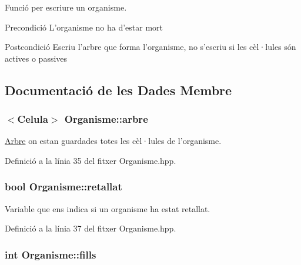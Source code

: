 Funció per escriure un organisme. 

\begin{DoxyPrecond}{Precondició}
L'organisme no ha d'estar mort 
\end{DoxyPrecond}
\begin{DoxyPostcond}{Postcondició}
Escriu l'arbre que forma l'organisme, no s'escriu si les cèl·lules són actives o passives 
\end{DoxyPostcond}


\subsection{Documentació de les Dades Membre}
\hypertarget{class_organisme_aa6bc89f1937afd04f86e770c2bde8c69}{
\subsubsection[{arbre}]{$<${\bf Celula}$>$ Organisme\-::arbre\hspace{0.3cm}{\ttfamily [private]}}}\label{class_organisme_aa6bc89f1937afd04f86e770c2bde8c69}


\hyperlink{class_arbre}{Arbre} on estan guardades totes les cèl·lules de l'organisme. 



Definició a la línia 35 del fitxer Organisme.\-hpp.

\hypertarget{class_organisme_acf912225a83570cb68542dcc6709023a}{
\subsubsection[{retallat}]{\setlength{\rightskip}{0pt plus 5cm}bool Organisme\-::retallat\hspace{0.3cm}{\ttfamily [private]}}}\label{class_organisme_acf912225a83570cb68542dcc6709023a}


Variable que ens indica si un organisme ha estat retallat. 



Definició a la línia 37 del fitxer Organisme.\-hpp.

\hypertarget{class_organisme_a4644da413bb0e38f34566334ebee1c1c}{
\subsubsection[{fills}]{\setlength{\rightskip}{0pt plus 5cm}int Organisme\-::fills\hspace{0.3cm}{\ttfamily [private]}}}\label{class_organisme_a4644da413bb0e38f34566334ebee1c1c}


